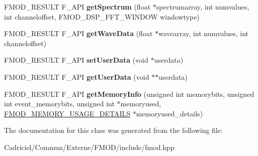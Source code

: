 \begin{DoxyCompactItemize}
\item 
F\+M\+O\+D\+\_\+\+R\+E\+S\+U\+LT F\+\_\+\+A\+PI {\bfseries get\+Spectrum} (float $\ast$spectrumarray, int numvalues, int channeloffset, F\+M\+O\+D\+\_\+\+D\+S\+P\+\_\+\+F\+F\+T\+\_\+\+W\+I\+N\+D\+OW windowtype)\hypertarget{class_f_m_o_d_1_1_channel_group_a8ee0bad7f2c729641b5d61f2f2aff135}{}\label{class_f_m_o_d_1_1_channel_group_a8ee0bad7f2c729641b5d61f2f2aff135}

\item 
F\+M\+O\+D\+\_\+\+R\+E\+S\+U\+LT F\+\_\+\+A\+PI {\bfseries get\+Wave\+Data} (float $\ast$wavearray, int numvalues, int channeloffset)\hypertarget{class_f_m_o_d_1_1_channel_group_a8d632fabc33cc9f67e528c76489c9172}{}\label{class_f_m_o_d_1_1_channel_group_a8d632fabc33cc9f67e528c76489c9172}

\item 
F\+M\+O\+D\+\_\+\+R\+E\+S\+U\+LT F\+\_\+\+A\+PI {\bfseries set\+User\+Data} (void $\ast$userdata)\hypertarget{class_f_m_o_d_1_1_channel_group_a0a71472fd896173cae99c4d2c42743df}{}\label{class_f_m_o_d_1_1_channel_group_a0a71472fd896173cae99c4d2c42743df}

\item 
F\+M\+O\+D\+\_\+\+R\+E\+S\+U\+LT F\+\_\+\+A\+PI {\bfseries get\+User\+Data} (void $\ast$$\ast$userdata)\hypertarget{class_f_m_o_d_1_1_channel_group_a347e86f79b6679e20b4515846644e8a4}{}\label{class_f_m_o_d_1_1_channel_group_a347e86f79b6679e20b4515846644e8a4}

\item 
F\+M\+O\+D\+\_\+\+R\+E\+S\+U\+LT F\+\_\+\+A\+PI {\bfseries get\+Memory\+Info} (unsigned int memorybits, unsigned int event\+\_\+memorybits, unsigned int $\ast$memoryused, \hyperlink{struct_f_m_o_d___m_e_m_o_r_y___u_s_a_g_e___d_e_t_a_i_l_s}{F\+M\+O\+D\+\_\+\+M\+E\+M\+O\+R\+Y\+\_\+\+U\+S\+A\+G\+E\+\_\+\+D\+E\+T\+A\+I\+LS} $\ast$memoryused\+\_\+details)\hypertarget{class_f_m_o_d_1_1_channel_group_a8483ad1631034c7be3fdcf0a9633bbb7}{}\label{class_f_m_o_d_1_1_channel_group_a8483ad1631034c7be3fdcf0a9633bbb7}

\end{DoxyCompactItemize}


The documentation for this class was generated from the following file\+:\begin{DoxyCompactItemize}
\item 
Cadriciel/\+Commun/\+Externe/\+F\+M\+O\+D/include/fmod.\+hpp\end{DoxyCompactItemize}
